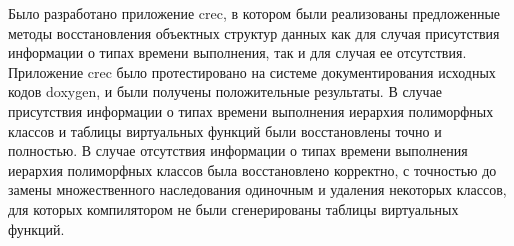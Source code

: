 Было разработано приложение crec, в котором были реализованы предложенные методы восстановления объектных структур данных как для случая присутствия информации о типах времени выполнения, так и для случая ее отсутствия. Приложение crec было протестировано на системе документирования исходных кодов doxygen, и были получены положительные результаты. В случае присутствия информации о типах времени выполнения иерархия полиморфных классов и таблицы виртуальных функций были восстановлены точно и полностью. В случае отсутствия информации о типах времени выполнения иерархия полиморфных классов была восстановлено корректно, с точностью до замены множественного наследования одиночным и удаления некоторых классов, для которых компилятором не были сгенерированы таблицы виртуальных функций.








